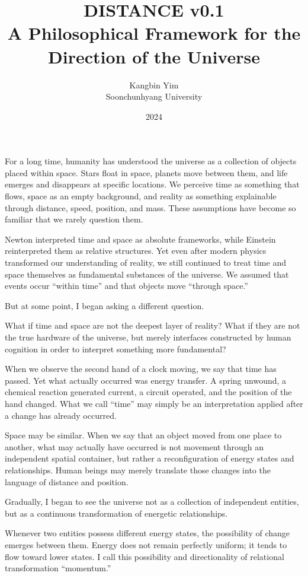 \documentclass[11pt]{article}
\title{DISTANCE v0.1\\[0.5em]
\large A Philosophical Framework for the Direction of the Universe}
\author{Kangbin Yim\\Soonchunhyang University}
\date{2024}
\begin{document}
\maketitle

For a long time, humanity has understood the universe as a collection of objects placed within space. Stars float in space, planets move between them, and life emerges and disappears at specific locations. We perceive time as something that flows, space as an empty background, and reality as something explainable through distance, speed, position, and mass. These assumptions have become so familiar that we rarely question them.

Newton interpreted time and space as absolute frameworks, while Einstein reinterpreted them as relative structures. Yet even after modern physics transformed our understanding of reality, we still continued to treat time and space themselves as fundamental substances of the universe. We assumed that events occur ``within time'' and that objects move ``through space.''

But at some point, I began asking a different question.

What if time and space are not the deepest layer of reality?
What if they are not the true hardware of the universe, but merely interfaces constructed by human cognition in order to interpret something more fundamental?

When we observe the second hand of a clock moving, we say that time has passed. Yet what actually occurred was energy transfer. A spring unwound, a chemical reaction generated current, a circuit operated, and the position of the hand changed. What we call ``time'' may simply be an interpretation applied after a change has already occurred.

Space may be similar. When we say that an object moved from one place to another, what may actually have occurred is not movement through an independent spatial container, but rather a reconfiguration of energy states and relationships. Human beings may merely translate those changes into the language of distance and position.

Gradually, I began to see the universe not as a collection of independent entities, but as a continuous transformation of energetic relationships.

Whenever two entities possess different energy states, the possibility of change emerges between them. Energy does not remain perfectly uniform; it tends to flow toward lower states. I call this possibility and directionality of relational transformation ``momentum.''
\end{document}
